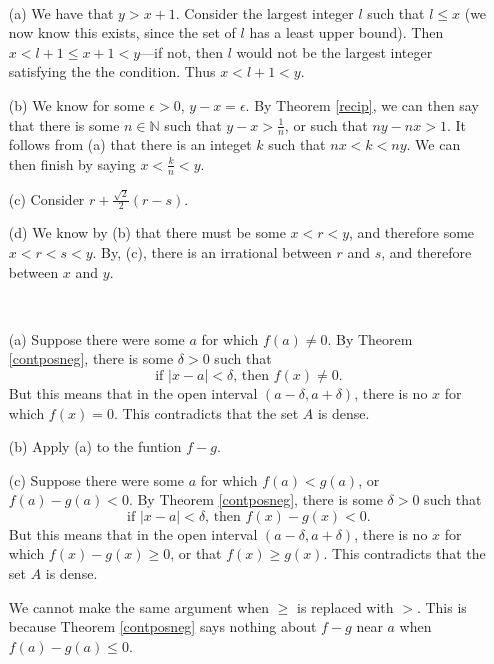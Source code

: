 \begin{problem}[8-5] \ 
\begin{enumerate}
\item[(a)]
We have that $y > x + 1$. Consider the largest integer $l$ such that $l \le x$ (we now know this exists, since the set of $l$ has a least upper bound). Then $x < l + 1 \le x + 1 < y$---if not, then $l$ would not be the largest integer satisfying the the condition. Thus $x < l + 1 < y$.

\item[(b)]
We know for some $\epsilon > 0$, $y - x = \epsilon$. By Theorem \ref{recip}, we can then say that there is some $n \in \mathbb{N}$ such that $y - x > \frac{1}{n}$, or such that $ny - nx > 1$. It follows from (a) that there is an integet $k$ such that $nx < k < ny$. We can then finish by saying $x < \frac{k}{n} < y$.

\item[(c)]
Consider $r + \frac{\sqrt{2}}{2}(r - s)$.

\item[(d)]
We know by (b) that there must be some $x < r < y$, and therefore some $x < r < s < y$. By, (c), there is an irrational between $r$ and $s$, and therefore between $x$ and $y$.
\end{enumerate}
\end{problem}

\begin{problem}[8-6] \ 
\begin{enumerate}
\item[(a)]
Suppose there were some $a$ for which $f(a) \ne 0$. By Theorem \ref{contposneg}, there is some $\delta > 0$ such that 
\[ \textrm{if } |x - a| < \delta \textrm{, then } f(x) \ne 0. \]
But this means that in the open interval $(a - \delta, a + \delta)$, there is no $x$ for which $f(x) = 0$. This contradicts that the set $A$ is dense.

\item[(b)]
Apply (a) to the funtion $f - g$.

\item[(c)]
Suppose there were some $a$ for which $f(a) < g(a)$, or $f(a) - g(a) < 0$. By Theorem \ref{contposneg}, there is some $\delta > 0$ such that 
\[ \textrm{if } |x - a| < \delta \textrm{, then } f(x) - g(x) < 0. \]
But this means that in the open interval $(a - \delta, a + \delta)$, there is no $x$ for which $f(x) - g(x) \ge 0$, or that $f(x) \ge g(x)$. This contradicts that the set $A$ is dense.

We cannot make the same argument when $\ge$ is replaced with $>$. This is because Theorem \ref{contposneg} says nothing about $f - g$ near $a$ when $f(a) - g(a) \le 0$.
\end{enumerate}
\end{problem}

